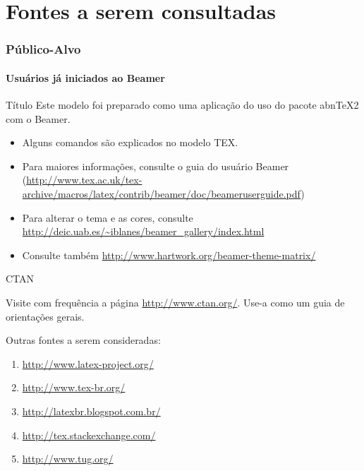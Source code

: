\documentclass[aspectratio=169]{beamer}
\begin{document}
\section{Fontes a serem consultadas}
\begin{frame}
\frametitle{Público-Alvo}
\framesubtitle{Usuários já iniciados ao Beamer}

\begin{block}{Título}
 Este modelo foi preparado como uma aplicação do uso do pacote abnTeX2 com o Beamer.
\end{block}

\begin{itemize}
 \item Alguns comandos são explicados no modelo TEX. \pause
 
 \item Para maiores informações, consulte o guia do usuário Beamer 
 (\url{http://www.tex.ac.uk/tex-archive/macros/latex/contrib/beamer/doc/beameruserguide.pdf})\pause
 
 \item Para alterar o tema e as cores, consulte 
 \url{http://deic.uab.es/~iblanes/beamer_gallery/index.html}
 
 \item Consulte também \url{http://www.hartwork.org/beamer-theme-matrix/}
\end{itemize}

\end{frame}

\begin{frame}{CTAN}

Visite com frequência a página \url{http://www.ctan.org/}. 
Use-a como um guia de orientações gerais.
\vspace{0.7cm}

Outras fontes a serem consideradas:
\begin{enumerate}
 \item \url{http://www.latex-project.org/}
 \item \url{http://www.tex-br.org/}
 \item \url{http://latexbr.blogspot.com.br/}
 \item \url{http://tex.stackexchange.com/}
 \item \url{http://www.tug.org/}
\end{enumerate}

\end{frame}
\end{document}
